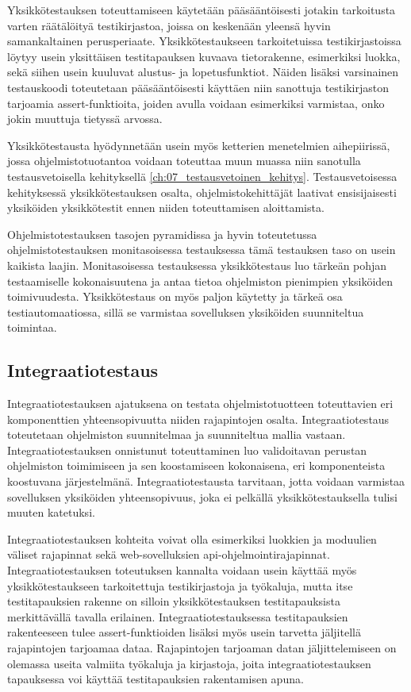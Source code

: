     Yksikkötestauksen toteuttamiseen käytetään pääsääntöisesti jotakin tarkoitusta varten räätälöityä testikirjastoa, joissa on keskenään yleensä hyvin samankaltainen perusperiaate.
    Yksikkötestaukseen tarkoitetuissa testikirjastoissa löytyy usein yksittäisen testitapauksen kuvaava tietorakenne, esimerkiksi luokka, sekä siihen usein kuuluvat alustus- ja lopetusfunktiot.
    Näiden lisäksi varsinainen testauskoodi toteutetaan pääsääntöisesti käyttäen niin sanottuja testikirjaston tarjoamia assert-funktioita, joiden avulla voidaan esimerkiksi varmistaa, onko jokin muuttuja tietyssä arvossa.

    Yksikkötestausta hyödynnetään usein myös ketterien menetelmien aihepiirissä, jossa ohjelmistotuotantoa voidaan toteuttaa muun muassa niin sanotulla testausvetoisella kehityksellä \ref{ch:07_testausvetoinen_kehitys}.
    Testausvetoisessa kehityksessä yksikkötestauksen osalta, ohjelmistokehittäjät laativat ensisijaisesti yksiköiden yksikkötestit ennen niiden toteuttamisen aloittamista.

    Ohjelmistotestauksen tasojen pyramidissa ja hyvin toteutetussa ohjelmistotestauksen monitasoisessa testauksessa tämä testauksen taso on usein kaikista laajin.
    Monitasoisessa testauksessa yksikkötestaus luo tärkeän pohjan testaamiselle kokonaisuutena ja antaa tietoa ohjelmiston pienimpien yksiköiden toimivuudesta.
    Yksikkötestaus on myös paljon käytetty ja tärkeä osa testiautomaatiossa, sillä se varmistaa sovelluksen yksiköiden suunniteltua toimintaa.

  \subsection{Integraatiotestaus} \label{ch:07_integraatiotestaus}

    Integraatiotestauksen ajatuksena on testata ohjelmistotuotteen toteuttavien eri komponenttien yhteensopivuutta niiden rajapintojen osalta.
    Integraatiotestaus toteutetaan ohjelmiston suunnitelmaa ja suunniteltua mallia vastaan.
    Integraatiotestauksen onnistunut toteuttaminen luo validoitavan perustan ohjelmiston toimimiseen ja sen koostamiseen kokonaisena, eri komponenteista koostuvana järjestelmänä.
    Integraatiotestausta tarvitaan, jotta voidaan varmistaa sovelluksen yksiköiden yhteensopivuus, joka ei pelkällä yksikkötestauksella tulisi muuten katetuksi.

    Integraatiotestauksen kohteita voivat olla esimerkiksi luokkien ja moduulien väliset rajapinnat sekä web-sovelluksien api-ohjelmointirajapinnat.
    Integraatiotestauksen toteutuksen kannalta voidaan usein käyttää myös yksikkötestaukseen tarkoitettuja testikirjastoja ja työkaluja, mutta itse testitapauksien rakenne on silloin yksikkötestauksen testitapauksista merkittävällä tavalla erilainen.
    Integraatiotestauksessa testitapauksien rakenteeseen tulee assert-funktioiden lisäksi myös usein tarvetta jäljitellä rajapintojen tarjoamaa dataa.
    Rajapintojen tarjoaman datan jäljittelemiseen on olemassa useita valmiita työkaluja ja kirjastoja, joita integraatiotestauksen tapauksessa voi käyttää testitapauksien rakentamisen apuna.

